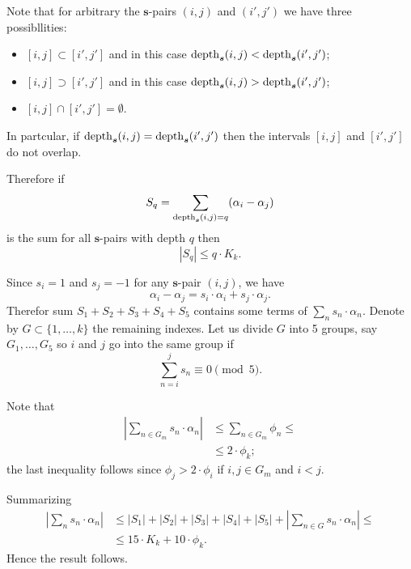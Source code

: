 \documentclass[a4paper,10pt]{amsart}
\begin{document}
Note that for arbitrary the $\bm{s}$-pairs $(i,j)$ and $(i',j')$
we have three possibllities:
\begin{itemize}
\item $[i,j]\subset [i',j']$ and in this case $\mathop{\rm depth}\nolimits_{\bm{s}}(i,j)<\mathop{\rm depth}\nolimits_{\bm{s}}(i',j')$;
\item $[i,j]\supset [i',j']$ and in this case $\mathop{\rm depth}\nolimits_{\bm{s}}(i,j)>\mathop{\rm depth}\nolimits_{\bm{s}}(i',j')$;
\item $[i,j]\cap [i',j']=\emptyset$.
\end{itemize}
In partcular, if $\mathop{\rm depth}\nolimits_{\bm{s}}(i,j)=\mathop{\rm depth}\nolimits_{\bm{s}}(i',j')$ then the intervals $[i,j]$ and $[i',j']$ do not overlap.


Therefore if 
\[S_q=\sum_{\mathop{\rm depth}\nolimits_{\bm{s}}(i,j)=q} (\alpha_i-\alpha_j)\] 
is the sum for all $\bm{s}$-pairs with depth $q$ then 
\[|S_q|\le q\cdot K_k.\]

Since $s_i=1$ and $s_j=-1$ for any $\bm{s}$-pair $(i,j)$,
we have
\[\alpha_i-\alpha_j=s_i\cdot\alpha_i+s_j\cdot\alpha_j.\]
Therefor sum  $S_1+S_2+S_3+S_4+S_5$  contains some  terms of 
$\sum_{n} s_n\cdot \alpha_n$.
Denote by $G\subset\{1,\dots,k\}$ the remaining indexes.
Let us divide $G$ into 5 groups, say $G_1,\dots,G_5$ 
so $i$ and $j$ go into the same group if 
\[\sum_{n=i}^j s_n\equiv 0\pmod 5.\]

Note that
\begin{align*}
|\sum_{n\in G_m}s_n\cdot \alpha_n|
&\le \sum_{n\in G_m}\phi_n\le
\\
&\le 2\cdot\phi_k;
\end{align*}
the last inequality follows since
$\phi_j>2\cdot \phi_i$
if $i,j\in G_m$ and $i<j$.

Summarizing
\begin{align*}
|\sum_n s_n\cdot\alpha_n|&\le |S_1|+|S_2|+|S_3|+|S_4|+|S_5|+|\sum_{n\in G} s_n\cdot\alpha_n|\le
\\
&\le 15\cdot K_k+10\cdot \phi_k.
\end{align*}
Hence the result follows.
\qeds
\end{document}

